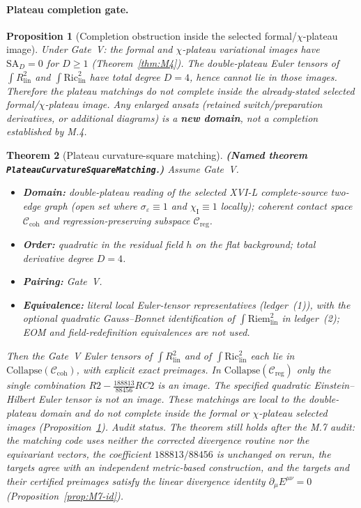 \documentclass{article}
\newtheorem{proposition}{Proposition}
\newtheorem{theorem}[proposition]{Theorem}
\theoremstyle{remark}
\newcommand{\sigeps}{\sigma_\varepsilon}
\newcommand{\chiI}{\chi_{\mathrm I}}
\newcommand{\Ccoh}{\mathcal C_{\mathrm{coh}}}
\newcommand{\Creg}{\mathcal C_{\mathrm{reg}}}
\newcommand{\Coll}{\mathrm{Collapse}}
\begin{document}
\paragraph{Plateau completion gate.}
\begin{proposition}[Completion obstruction inside the selected formal/$\chi$-plateau image]
\label{prop:completion}
Under Gate~V: the formal and $\chi$-plateau variational images have $\mathrm{SA}_D=0$ for $D\ge1$ (Theorem~\ref{thm:M4}).
The double-plateau Euler tensors of $\int R_{\mathrm{lin}}^2$ and $\int\mathrm{Ric}_{\mathrm{lin}}^2$ have total degree $D=4$, hence cannot lie in those images.
Therefore the plateau matchings do \emph{not} complete inside the already-stated selected formal/$\chi$-plateau image.
Any enlarged ansatz (retained switch/preparation derivatives, or additional diagrams) is a \textbf{new domain}, not a completion established by M.4.
\end{proposition}

\begin{theorem}[Plateau curvature-square matching]
\label{thm:M5-plateau-R2}
\textbf{(Named theorem \texttt{PlateauCurvatureSquareMatching}.)}
Assume Gate~V.
\begin{itemize}
\item \textbf{Domain:} double-plateau reading of the selected XVI-L complete-source two-edge graph (open set where $\sigeps\equiv1$ and $\chiI\equiv1$ locally); coherent contact space $\Ccoh$ and regression-preserving subspace $\Creg$.
\item \textbf{Order:} quadratic in the residual field $h$ on the flat background; total derivative degree $D=4$.
\item \textbf{Pairing:} Gate~V.
\item \textbf{Equivalence:} literal local Euler-tensor representatives (ledger~(1)), with the optional quadratic Gauss--Bonnet identification of $\int\mathrm{Riem}_{\mathrm{lin}}^2$ in ledger~(2); EOM and field-redefinition equivalences are not used.
\end{itemize}
Then the Gate~V Euler tensors of $\int R_{\mathrm{lin}}^2$ and of $\int\mathrm{Ric}_{\mathrm{lin}}^2$ each lie in $\Coll(\Ccoh)$, with explicit exact preimages.
In $\Coll(\Creg)$ only the single combination $R2-\tfrac{188813}{88456}RC2$ is an image.
The specified quadratic Einstein--Hilbert Euler tensor is not an image.
These matchings are local to the double-plateau domain and do not complete inside the formal or $\chi$-plateau selected images (Proposition~\ref{prop:completion}).
\emph{Audit status.} The theorem still holds after the M.7 audit: the matching code uses neither the corrected divergence routine nor the equivariant vectors, the coefficient $188813/88456$ is unchanged on rerun, the targets agree with an independent metric-based construction, and the targets and their certified preimages satisfy the linear divergence identity $\partial_\mu E^{\mu\nu}=0$ (Proposition~\ref{prop:M7-id}).
\end{theorem}
\end{document}
